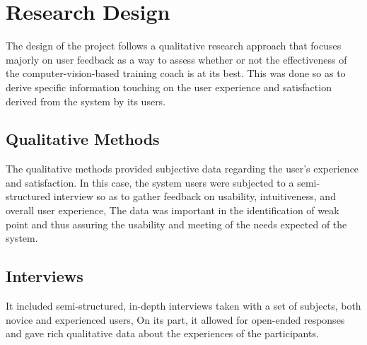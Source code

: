 


\section{Research Design}
    The design of the project follows a qualitative research approach that focuses majorly on user feedback as a way to assess whether or not the effectiveness of the computer-vision-based training coach is at its best. This was done so as to derive specific information touching on the user experience and satisfaction derived from the system by its users.
    \subsection{Qualitative Methods}
        The qualitative methods provided subjective data regarding the user's experience and satisfaction. In this case, the system users were subjected to a semi-structured interview so as to gather feedback on usability, intuitiveness, and overall user experience, The data was important in the identification of weak point and thus assuring the usability and meeting of the needs expected of the system.
    \subsection{Interviews}
        It included semi-structured, in-depth interviews taken with a set of subjects, both novice and experienced users, On its part, it allowed for open-ended responses and gave rich qualitative data about the experiences of the participants.
